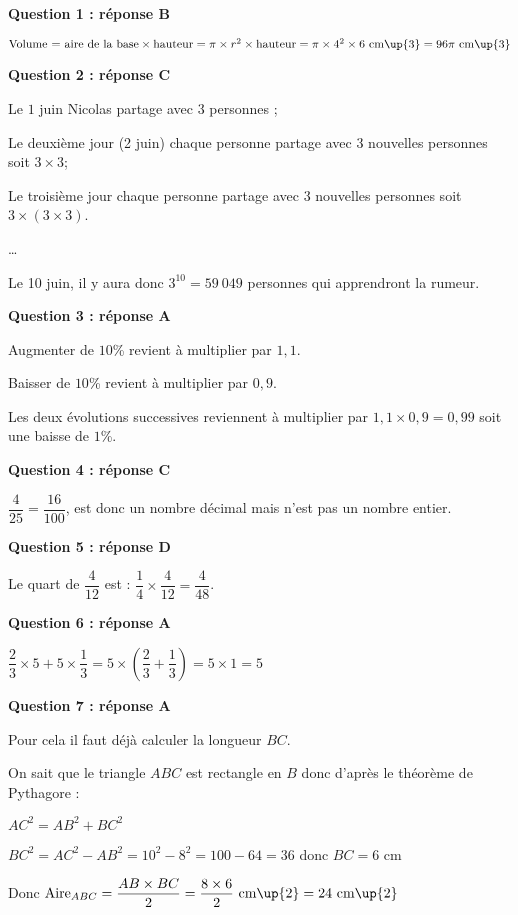 \textbf{Question 1 : réponse B}
\medskip

$\text{Volume = aire de la base}\times \text{hauteur} = \pi \times r^2 \times \text{hauteur} = \pi \times 4^2 \times 6~\text{cm\up{3}}=96\pi~\text{cm\up{3}}$ 

\medskip
\textbf{Question 2 : réponse C}
\medskip

Le $1$ juin Nicolas partage avec $3$ personnes ;

Le deuxième jour (2 juin) chaque personne partage avec 3 nouvelles personnes soit $3\times 3$;

Le troisième jour chaque personne partage avec $3$ nouvelles personnes soit $3 \times (3 \times 3)$.

\ldots

Le 10 juin, il y aura donc $3^{10}=59~049$ personnes qui apprendront la rumeur. 

\medskip
\textbf{Question 3 : réponse A}
\medskip

Augmenter de $10$\% revient à multiplier par $1,1$.

Baisser de $10$\% revient à multiplier par $0,9$. 

Les deux évolutions successives reviennent à multiplier par $1,1 \times 0,9 = 0,99$ soit une baisse de $1$\%.

\medskip
\textbf{Question 4 : réponse C}
\medskip

$\dfrac{4}{25} = \dfrac{16}{100}$, est donc un nombre décimal mais n’est pas un nombre entier. 

\medskip
\textbf{Question 5 : réponse D}
\medskip

Le quart de $\dfrac{4}{12}$ est : $\dfrac{1}{4}\times \dfrac{4}{12} = \dfrac{4}{48}$.

\medskip
\textbf{Question 6 : réponse A}
\medskip

$\dfrac{2}{3}\times 5 + 5\times \dfrac{1}{3} = 5\times \left(\dfrac{2}{3} + \dfrac{1}{3}\right) = 5\times 1 = 5$

\medskip
\textbf{Question 7 : réponse A}
\medskip

Pour cela il faut déjà calculer la longueur $BC$.

On sait que le triangle $ABC$ est rectangle en $B$ donc d’après le théorème de Pythagore :
\begin{spacing}{2}
$AC^2 = AB^2 + BC^2$

$BC^2 = AC^2 - AB^2 = 10^2 - 8^2 = 100 - 64 = 36$ donc $BC = 6$ cm

Donc $\text{Aire}_{ABC} = \dfrac{AB \times BC}{2}=\dfrac{8\times 6}{2}~\text{cm\up{2}}=24~\text{cm\up{2}}$
\end{spacing}

